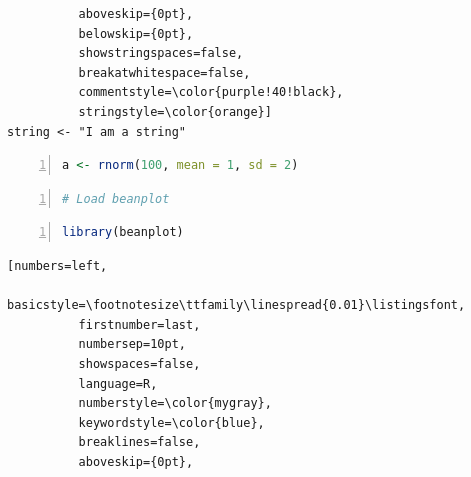 \documentclass{tufte-book}\usepackage[]{graphicx}\usepackage[]{color}
\makeatletter
\newenvironment{kframe}{%
 \def\at@end@of@kframe{}%
 \ifinner\ifhmode%
  \def\at@end@of@kframe{\end{minipage}}%
  \begin{minipage}{\columnwidth}%
 \fi\fi%
 \def\FrameCommand##1{\hskip\@totalleftmargin \hskip-\fboxsep
 \colorbox{shadecolor}{##1}\hskip-\fboxsep
     \hskip-\linewidth \hskip-\@totalleftmargin \hskip\columnwidth}%
 \MakeFramed {\advance\hsize-\width
   \@totalleftmargin\z@ \linewidth\hsize
   \@setminipage}}%
 {\par\unskip\endMakeFramed%
 \at@end@of@kframe}
\newenvironment{knitrout}{}{} %
\makeatother
\begin{document}
\begin{knitrout}
\begin{kframe}
\begin{lstlisting}
          aboveskip={0pt},
          belowskip={0pt},
          showstringspaces=false,
          breakatwhitespace=false,
          commentstyle=\color{purple!40!black},
          stringstyle=\color{orange}]
string <- "I am a string"\end{lstlisting}
\begin{lstlisting}[numbers=left, 
          basicstyle=\footnotesize\ttfamily\linespread{0.01}\listingsfont,
          firstnumber=last, 
          numbersep=10pt, 
          showspaces=false,
          language=R,
          numberstyle=\color{mygray}, 
          keywordstyle=\color{blue},
          breaklines=false,
          aboveskip={0pt},
          belowskip={0pt},
          showstringspaces=false,
          breakatwhitespace=false,
          commentstyle=\color{purple!40!black},
          stringstyle=\color{orange}]
a <- rnorm(100, mean = 1, sd = 2)\end{lstlisting}
\begin{lstlisting}[numbers=left, 
          basicstyle=\footnotesize\ttfamily\linespread{0.01}\listingsfont,
          firstnumber=last, 
          numbersep=10pt, 
          showspaces=false,
          language=R,
          numberstyle=\color{mygray}, 
          keywordstyle=\color{blue},
          breaklines=false,
          aboveskip={0pt},
          belowskip={0pt},
          showstringspaces=false,
          breakatwhitespace=false,
          commentstyle=\color{purple!40!black},
          stringstyle=\color{orange}]
# Load beanplot\end{lstlisting}
\begin{lstlisting}[numbers=left, 
          basicstyle=\footnotesize\ttfamily\linespread{0.01}\listingsfont,
          firstnumber=last, 
          numbersep=10pt, 
          showspaces=false,
          language=R,
          numberstyle=\color{mygray}, 
          keywordstyle=\color{blue},
          breaklines=false,
          aboveskip={0pt},
          belowskip={0pt},
          showstringspaces=false,
          breakatwhitespace=false,
          commentstyle=\color{purple!40!black},
          stringstyle=\color{orange}]
library(beanplot)\end{lstlisting}
\begin{lstlisting}[numbers=left, 
          basicstyle=\footnotesize\ttfamily\linespread{0.01}\listingsfont,
          firstnumber=last, 
          numbersep=10pt, 
          showspaces=false,
          language=R,
          numberstyle=\color{mygray}, 
          keywordstyle=\color{blue},
          breaklines=false,
          aboveskip={0pt},

\end{lstlisting}
\end{kframe}
\end{knitrout}
\end{document}
